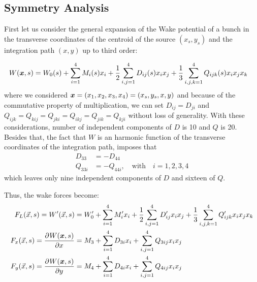 \begin{apendicesenv}
\chapter{Symmetry Analysis}\label{app:symmetry_analysis}

    First let us consider the general expansion of the Wake potential of a bunch in the transverse coordinates of the centroid of the source $(x_s,y_s)$ and the integration path $(x,y)$ up to third order:

    \begin{align}
		W(\boldsymbol{x},s) &= W_0(s) + \sum_{i=1}^4 M_i(s) x_i + \frac12\sum_{i,j=1}^4 D_{ij}(s) x_i x_j + \frac13\sum_{i,j,k=1}^4 Q_{ijk}(s) x_i x_j x_k
    \end{align}
    where we considered $\boldsymbol{x} = (x_1,x_2,x_3,x_4) = (x_s,y_s,x,y)$ and because of the commutative property of multiplication, we can set $D_{ij} = D_{ji}$ and $Q_{ijk}=Q_{kij}=Q_{jki}=Q_{ikj}=Q_{jik}=Q_{kji}$ without loss of generality. With these considerations, number of independent components of $D$ is 10 and $Q$ is 20. Besides that, the fact that $W$ is an harmonic function of the transverse coordinates of the integration path, imposes that
    \begin{align}
		D_{33} &= - D_{44} \\
		Q_{33i} &= - Q_{44i}, \quad \text{with} \quad i=1,2,3,4
    \end{align}
    which leaves only nine independent components of $D$ and sixteen of $Q$.

    Thus, the wake forces become:
    \begin{align}
		F_L(\vec{x},s) = W'(\vec{x},s) &= W_0' + \sum_{i=1}^4 M_i' x_i + \frac12\sum_{i,j=1}^4 D_{ij}' x_i x_j + \frac13\sum_{i,j,k=1}^4 Q_{ijk}' x_i x_j x_k \\
		F_x(\vec{x},s) = \frac{\partial^{{}}W(\boldsymbol{x},s)}{\partial x^{{}}} &= M_3 + \sum_{i=1}^4 D_{3i} x_i + \sum_{i,j=1}^4 Q_{3ij} x_i x_j \\
		F_y(\vec{x},s) = \frac{\partial^{{}}W(\boldsymbol{x},s)}{\partial y^{{}}} &= M_4 + \sum_{i=1}^4 D_{4i} x_i + \sum_{i,j=1}^4 Q_{4ij} x_i x_j
    \end{align}


\end{apendicesenv}
